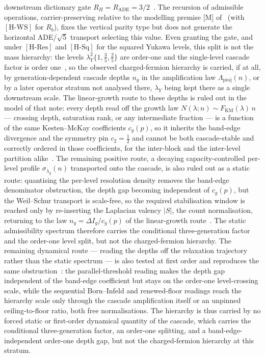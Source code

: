 \documentclass[11pt,a4paper]{article}
\theoremstyle{definition}
\newcommand{\HRes}{\ensuremath{[\mathrm{H\text{-}Res}]}}
\newcommand{\HSq}{\ensuremath{[\mathrm{H\text{-}Sq}]}}
\newcommand{\HWS}{\ensuremath{[\mathrm{H\text{-}WS}]}}
\begin{document}
      downstream dictionary gate $R_\Pi=R_{\mathrm{ADE}}=3/2$~\cite{Beau2026pyo}.
      The recursion of admissible operations, carrier-preserving relative to the modelling premise [M] of~\cite{Beau2026aog} (with \HWS{} for $R_b$), fixes the vertical parity type but does not generate the horizontal
      ADE/$\sqrt{5}$ transport selecting this value.
      Even granting the gate, and under \HRes{} and \HSq{} for the squared Yukawa levels, this split is not the mass
      hierarchy: the levels $\lambda_Y^2\{1,\tfrac35,\tfrac25\}$ are order-one and the single-level cascade factor
        is order
      one~\cite{Beau2026pyo, Beau2026a5}, so the observed charged-fermion hierarchy is carried, if at all, by
      generation-dependent cascade depths $n_g$ in the amplification law $\Lambda_{\mathrm{proj}}(n)$, or by a later
      operator stratum not analysed there, $\lambda_Y$ being kept there as a single downstream scale.
      The linear-growth route to these depths is ruled out in the model of that note:
      every depth read off the growth law
      $N(\lambda;n)\sim F_{\mathrm{KM}}(\lambda)\,n$~\cite{Beau2026a5} --- crossing depth, saturation rank, or any
      intermediate fraction --- is a function of the same Kesten--McKay coefficients $c_g(p)$, so it inherits the
      band-edge divergence and the symmetry pin $c_2=\tfrac12$ and cannot be both cascade-stable and correctly
      ordered in
      those coefficients, for the inter-block and the inter-level partition alike~\cite{Beau2026pyo}.
      The remaining positive route, a decaying capacity-controlled per-level profile $\sigma_{\lambda_g}(n)$
      transported onto the cascade, is also ruled out as a static route: quantising the per-level
      resolution density removes the band-edge denominator obstruction, the depth gap becoming independent of
      $c_g(p)$, but the Weil--Schur transport is scale-free, so the required stabilisation window is reached only
      by re-inserting the Laplacian valency $|S|$, the count normalisation, returning to the law
      $n_g=\Delta I_g/c_g(p)$ of the linear-growth route~\cite{Beau2026pyo}.
      The static admissibility spectrum therefore carries the conditional three-generation factor and the order-one
      level split,
      but not the charged-fermion hierarchy.
      The remaining dynamical route --- reading the depths off the relaxation trajectory rather than the static
      spectrum --- is also tested at first order and reproduces the same obstruction~\cite{Beau2026pyo}:
      the parallel-threshold reading makes the depth gap independent of the band-edge coefficient but stays on the
      order-one level-crossing scale, while the sequential Born--Infeld and renewed-floor readings reach the
      hierarchy scale only through the cascade amplification itself or an unpinned ceiling-to-floor ratio, both
      free normalisations.
      The hierarchy is thus carried by no forced static or first-order dynamical quantity of the cascade, which
      carries the conditional three-generation factor, an order-one splitting, and a band-edge-independent order-one
      depth gap, but not
      the charged-fermion hierarchy at this stratum.
\end{document}
